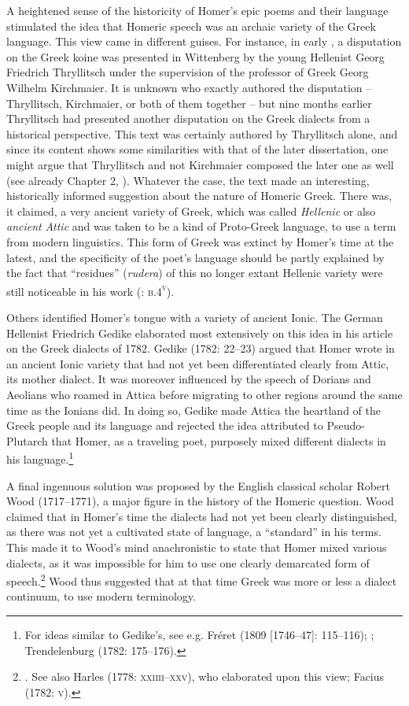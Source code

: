 A heightened sense of the historicity of Homer’s epic poems and their language stimulated the idea that Homeric speech was an archaic variety of the Greek language. This view came in different guises. For instance, in early \citealt{November1709}, a disputation on the Greek koine was presented in Wittenberg by the young Hellenist Georg Friedrich Thryllitsch under the supervision of the professor of Greek Georg Wilhelm Kirchmaier. It is unknown who exactly authored the disputation – Thryllitsch, Kirchmaier, or both of them together – but nine months earlier Thryllitsch had presented another disputation on the Greek dialects from a historical perspective. This text was certainly authored by Thryllitsch alone, and since its content shows some similarities with that of the later dissertation, one might argue that Thryllitsch and not Kirchmaier composed the later one as well (see already Chapter 2, ). Whatever the case, the text made an interesting, historically informed suggestion about the nature of Homeric Greek. There was, it claimed, a very ancient variety of Greek, which was called \textit{Hellenic} or also \textit{ancient} \textit{Attic} and was taken to be a kind of Proto-Greek language, to use a term from modern linguistics. This form of Greek was extinct by Homer’s time at the latest, and the specificity of the poet’s language should be partly explained by the fact that “residues” (\textit{rudera}) of this no longer extant Hellenic variety were still noticeable in his work (\citealt{KirchmaierThryllitsch1709}: \textsc{b.4}\textsc{\textsuperscript{v}}).

Others identified Homer’s tongue with a variety of ancient Ionic. The German Hellenist Friedrich Gedike elaborated most extensively on this idea in his article on the Greek dialects of 1782. Gedike (1782: 22–23) argued that Homer wrote in an ancient Ionic variety that had not yet been differentiated clearly from Attic, its mother dialect. It was moreover influenced by the speech of Dorians and Aeolians who roamed in Attica before migrating to other regions around the same time as the Ionians did. In doing so, Gedike made Attica the heartland of the Greek people and its language and rejected the idea attributed to Pseudo-Plutarch that Homer, as a traveling poet, purposely mixed different dialects in his language.\footnote{For ideas similar to Gedike’s, see e.g. Fréret (1809 [1746–47]: 115–116); \citet[202]{Beattie1778}; Trendelenburg (1782: 175–176).}

A final ingenuous solution was proposed by the English classical scholar Robert Wood (1717–1771), a major figure in the history of the Homeric question. Wood claimed that in Homer’s time the dialects had not yet been clearly distinguished, as there was not yet a cultivated state of language, a “standard” in his terms. This made it to Wood’s mind anachronistic to state that Homer mixed various dialects, as it was impossible for him to use one clearly demarcated form of speech.\footnote{\citet[238]{Wood1775}. See also Harles (1778: \textsc{xxiiii–xxv)}, who elaborated upon this view; Facius (1782: \textsc{v}).} Wood thus suggested that at that time Greek was more or less a dialect continuum, to use modern terminology.

